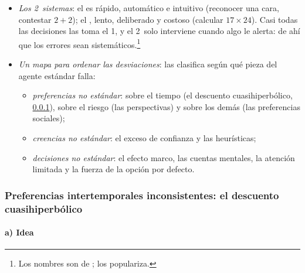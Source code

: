 \documentclass[11pt]{article}
\begin{document}
\begin{itemize}
\item \emph{Los 2~sistemas}\nocite{Kahneman2011Thinking}: el  es rápido, automático e intuitivo (reconocer una cara, contestar $2+2$); el , lento, deliberado y costoso (calcular $17\times24$). Casi todas las decisiones las toma el 1, y el 2~solo interviene cuando algo le alerta: de ahí que los errores sean sistemáticos.\footnote{Los nombres son de \textcite{StanovichWest2000Individual};  los populariza.}
\item \emph{Un mapa para ordenar las desviaciones}: \textcite{DellaVigna2009Psychology} las clasifica según qué pieza del agente estándar falla:
  \begin{itemize}
  \item \emph{preferencias no estándar}: sobre el tiempo (el descuento cuasihiperbólico, \ref{sec:beta-delta}), sobre el riesgo (las perspectivas) y sobre los demás (las preferencias sociales);
  \item \emph{creencias no estándar}: el exceso de confianza y las heurísticas;
  \item \emph{decisiones no estándar}: el efecto marco, las cuentas mentales, la atención limitada y la fuerza de la opción por defecto.
  \end{itemize}
\end{itemize}

\subsubsection{Preferencias intertemporales inconsistentes: el descuento cuasihiperbólico}\label{sec:beta-delta}

\paragraph{a) Idea}
\end{document}
